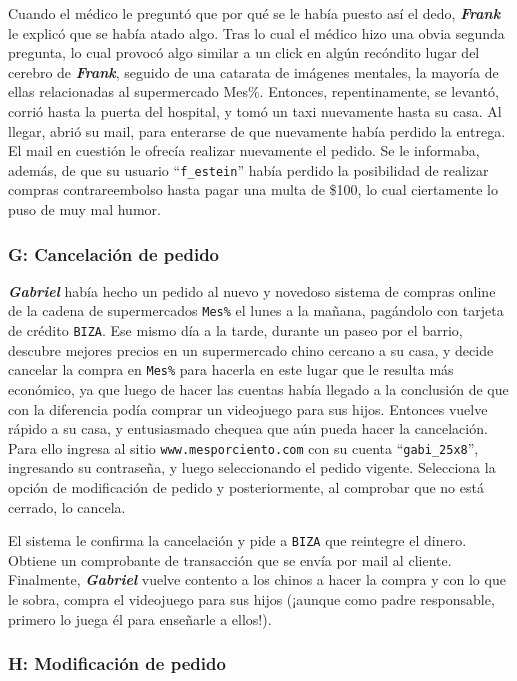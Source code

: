 Cuando el médico le preguntó que por qué se le había puesto así el dedo,
\textbf{\emph{Frank}} le explicó que se había atado algo. Tras lo cual el
médico hizo una obvia segunda pregunta, lo cual provocó algo similar a un
click en algún recóndito lugar del cerebro de \textbf{\emph{Frank}}, seguido
de una catarata de imágenes mentales, la mayoría de ellas relacionadas al
supermercado Mes\%. Entonces, repentinamente, se levantó, corrió hasta la
puerta del hospital, y tomó un taxi nuevamente hasta su casa. Al llegar, abrió
su mail, para enterarse de que nuevamente había perdido la entrega. El mail en
cuestión le ofrecía realizar nuevamente el pedido. Se le informaba, además, de
que su usuario ``\texttt{f\_estein}'' había perdido la posibilidad de realizar
compras contrareembolso hasta pagar una multa de \$100, lo cual ciertamente lo
puso de muy mal humor.

\subsubsection{G: Cancelación de pedido}

\textbf{\emph{Gabriel}} había hecho un pedido al nuevo y novedoso sistema de
compras online de la cadena de supermercados \texttt{Mes\%} el lunes a la
mañana, pagándolo con tarjeta de crédito \texttt{BIZA}. Ese mismo día a la
tarde, durante un paseo por el barrio, descubre mejores precios en un
supermercado chino cercano a su casa, y decide cancelar la compra en
\texttt{Mes\%} para hacerla en este lugar que le resulta más económico, ya que
luego de hacer las cuentas había llegado a la conclusión de que con la
diferencia podía comprar un videojuego para sus hijos. Entonces vuelve rápido
a su casa, y entusiasmado chequea que aún pueda hacer la cancelación. Para
ello ingresa al sitio \texttt{www.mesporciento.com} con su cuenta
``\texttt{gabi\_25x8}'', ingresando su contraseña, y luego seleccionando el
pedido vigente. Selecciona la opción de modificación de pedido y
posteriormente, al comprobar que no está cerrado, lo cancela.

El sistema le confirma la cancelación y pide a \texttt{BIZA} que reintegre el
dinero. Obtiene un comprobante de transacción que se envía por mail al
cliente. Finalmente, \textbf{\emph{Gabriel}} vuelve contento a los chinos a
hacer la compra y con lo que le sobra, compra el videojuego para sus hijos
(¡aunque como padre responsable, primero lo juega él para enseñarle a ellos!).

\subsubsection{H: Modificación de pedido}

